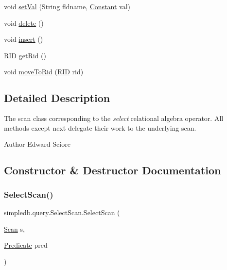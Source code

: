 \begin{DoxyCompactItemize}
\item 
void \hyperlink{classsimpledb_1_1query_1_1SelectScan_a2c767921954b2e2ea83ef5d90712b64f}{set\+Val} (String fldname, \hyperlink{classsimpledb_1_1query_1_1Constant}{Constant} val)
\item 
void \hyperlink{classsimpledb_1_1query_1_1SelectScan_a698afd872a1362c6d20e59396adf64bb}{delete} ()
\item 
void \hyperlink{classsimpledb_1_1query_1_1SelectScan_aef5c943c4a905265c588913e2f9958c2}{insert} ()
\item 
\hyperlink{classsimpledb_1_1record_1_1RID}{R\+ID} \hyperlink{classsimpledb_1_1query_1_1SelectScan_aa7c6dfd2ab2cd1846c4fa84ee2c455d5}{get\+Rid} ()
\item 
void \hyperlink{classsimpledb_1_1query_1_1SelectScan_ae2a640b4e49eb8cb5fef5f48103dca3e}{move\+To\+Rid} (\hyperlink{classsimpledb_1_1record_1_1RID}{R\+ID} rid)
\end{DoxyCompactItemize}


\subsection{Detailed Description}
The scan class corresponding to the {\itshape select} relational algebra operator. All methods except next delegate their work to the underlying scan. \begin{DoxyAuthor}{Author}
Edward Sciore 
\end{DoxyAuthor}


\subsection{Constructor \& Destructor Documentation}
\mbox{\label{classsimpledb_1_1query_1_1SelectScan_a3a8549a84679207bd80b583b7bb4c3f4}} 
\subsubsection{\texorpdfstring{Select\+Scan()}{SelectScan()}}
{\footnotesize\ttfamily simpledb.\+query.\+Select\+Scan.\+Select\+Scan (\begin{DoxyParamCaption}\item[{\hyperlink{interfacesimpledb_1_1query_1_1Scan}{Scan}}]{s,  }\item[{\hyperlink{classsimpledb_1_1query_1_1Predicate}{Predicate}}]{pred }\end{DoxyParamCaption})\hspace{0.3cm}{\ttfamily [inline]}}

